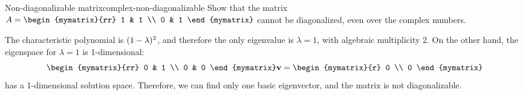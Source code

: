 \begin{example}{Non-diagonalizable matrix}{complex-non-diagonalizable}
  Show that the matrix $A =
    \begin{mymatrix}{rr}
      1 & 1 \\
      0 & 1
    \end{mymatrix}$ cannot be diagonalized, even over the complex numbers.
\end{example}

\begin{solution}
  The characteristic polynomial is $(1-\lambda)^2$, and therefore
  the only eigenvalue is $\lambda=1$, with algebraic multiplicity
  $2$. On the other hand, the eigenspace for $\lambda=1$ is
  1-dimensional:
  \begin{equation*}
    \begin{mymatrix}{rr}
      0 & 1 \\
      0 & 0
    \end{mymatrix}
    \vect{v}
    = \begin{mymatrix}{r} 0 \\ 0 \end{mymatrix}
  \end{equation*}
  has a 1-dimensional solution space. Therefore, we can find only one
  basic eigenvector, and the matrix is not diagonalizable.
\end{solution}
